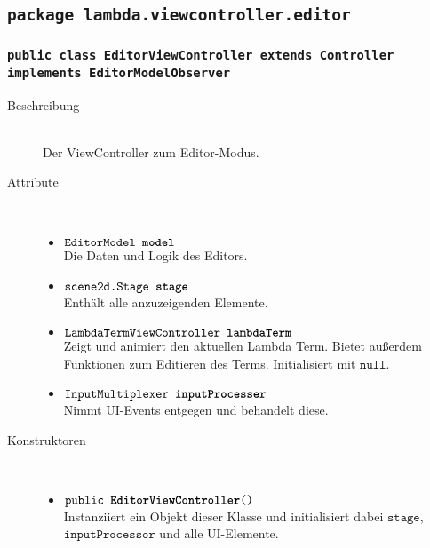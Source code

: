 \subsection{\texttt{package lambda.viewcontroller.editor}}

\subsubsection{\normalfont \texttt{public class \textbf{EditorViewController} extends Controller implements EditorModelObserver}}

\begin{description}
\item[Beschreibung] \hfill \\ Der ViewController zum Editor-Modus.

\item[Attribute] \hfill \\
	\vspace{-.8cm}
	\begin{itemize}
		\item $\texttt{EditorModel \textbf{model}}$ \\ Die Daten und Logik des Editors.
		\item $\texttt{scene2d.Stage \textbf{stage}}$ \\ Enthält alle anzuzeigenden Elemente.
		\item $\texttt{LambdaTermViewController \textbf{lambdaTerm}}$ \\ Zeigt und animiert den aktuellen Lambda Term. Bietet außerdem Funktionen zum Editieren des Terms. Initialisiert mit $\texttt{null}$.
		\item $\texttt{InputMultiplexer \textbf{inputProcesser}}$ \\ Nimmt UI-Events entgegen und behandelt diese.
	\end{itemize}
	
\item[Konstruktoren] \hfill \\
	\vspace{-.8cm}
	\begin{itemize}
		\item $\texttt{public \textbf{EditorViewController}()}$ \\ Instanziiert ein Objekt dieser Klasse und initialisiert dabei $\texttt{stage}$, $\texttt{inputProcessor}$ und alle UI-Elemente.
	\end{itemize}
	

\end{description}
